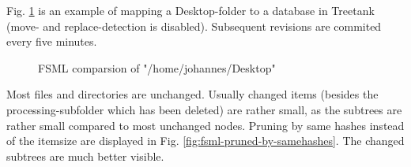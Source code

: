 Fig. \ref{fig:fsml-itemsize-pruning} is an example of mapping a Desktop-folder to a database in Treetank (move- and replace-detection is disabled). Subsequent revisions are commited every five minutes.

\begin{figure}[tb]
\caption{\label{fig:fsml-itemsize-pruning} FSML comparsion of "/home/johannes/Desktop"}
\end{figure}

Most files and directories are unchanged. Usually changed items (besides the processing-subfolder which has been deleted) are rather small, as the subtrees are rather small compared to most unchanged nodes. Pruning by same hashes instead of the itemsize are displayed in Fig. \ref{fig:fsml-pruned-by-samehashes}. The changed subtrees are much better visible. %

